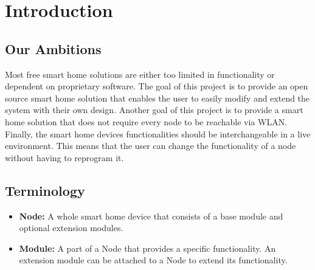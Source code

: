 \chapter{Introduction}
\renewcommand*\chapterpagestyle{scrheadings}

    \section{Our Ambitions}
        Most free smart home solutions are either too limited in
        functionality or dependent on proprietary software.
        The goal of this project is to provide an open source
        smart home solution that enables the user to easily modify 
        and extend the system with their own design. Another goal of
        this project is to provide a smart home solution that does
        not require every node to be reachable via WLAN. Finally,
        the smart home devices functionalities should be
        interchangeable in a live environment. This means that
        the user can change the functionality of a node without
        having to reprogram it.

    \section{Terminology}
        \begin{itemize}
            \item \textbf{Node:} A whole smart home device that
            consists of a base module and optional extension modules.

            \item \textbf{Module:} A part of a Node that provides
            a specific functionality. An extension module can be
            attached to a Node to extend its functionality.

        \end{itemize}

